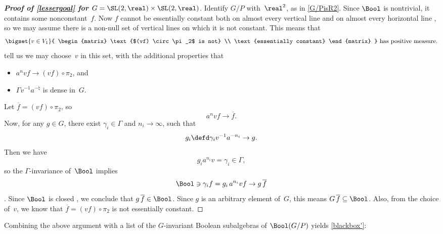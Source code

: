 \begin{proof}[\upshape \textbf{Proof of \cref{lessergoal} for $G = \SL(2,\real) \times \SL(2,\real)$}] 
Identify $G/P$ with~$\real^2$, as in \cref{G/PisR2}.
Since $\Bool$ is nontrivial, it contains some nonconstant~$f$.
Now $f$ cannot be essentially constant both on almost every vertical line and on almost every horizontal line , so we may assume there is a non-null set of vertical lines on which it is not constant. This means that
	 $$ \text{$\bigset{v \in V_1 }{ \begin{matrix} \text{$(vf) \circ \pi_2$ is not} \\ \text{essentially constant} \end{matrix} }$ 
	has positive measure.} $$
 tell us we may choose~$v$ in this set, with the additional properties that 
\begin{itemize}
\item $a^n v f \to (vf) \circ \pi_2$,
and
\item $\Gamma v^{-1} a^{-\natural}$ is dense in~$G$.
\end{itemize}
Let $\overline{f} = (vf) \circ \pi_2$, so
	$$ a^n v f \to \overline{f} .$$
Now, for any $g \in G$, there exist $\gamma_i \in \Gamma$ and $n_i \to \infty$, such that 
	 $$g_i \defd \gamma_i v^{-1} a^{-n_i} \to g .$$
Then we have 
	$$g_i a^{n_i} v = \gamma_i \in \Gamma ,$$
so the $\Gamma$-invariance of~$\Bool$ implies
	$$\Bool \ni \gamma_i f = g_i \, a^{n_i} v f\to g \, \overline {f} $$
.
Since $\Bool$ is closed , we conclude that $g \, \overline {f} \in \Bool$. Since $g$ is an arbitrary element of~$G$, this means $G \, \overline {f} \subseteq \Bool$.
Also, from the choice of~$v$, we know that $\overline {f} = (vf) \circ \pi_2$ is not essentially constant.
\end{proof}

Combining the above argument with a list of the $G$-invariant Boolean subalgebras of $\Bool(G/P)$ yields \cref{blackbox'}:

